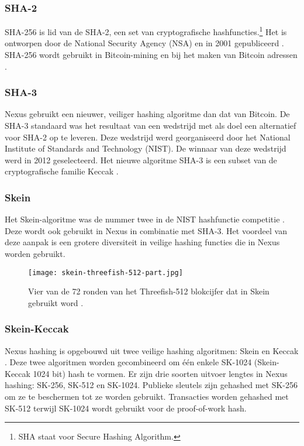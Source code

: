 \documentclass[11pt]{article}
\begin{document}
\subsubsection{SHA-2}

SHA-256 is lid van de SHA-2, een set van cryptografische hashfuncties.\footnote{SHA staat voor Secure Hashing Algorithm.}
Het is ontworpen door de National Security Agency (NSA) en in 2001 gepubliceerd \cite{wikisha2}.
SHA-256 wordt gebruikt in Bitcoin-mining en bij het maken van Bitcoin adressen \cite{bitwiki256}.

\subsubsection{SHA-3}

Nexus gebruikt een nieuwer, veiliger hashing algoritme dan dat van Bitcoin. 
De SHA-3 \cite{sha3} standaard was het resultaat van een wedstrijd \cite{nistcompetitionend} met als doel een alternatief voor SHA-2 op te leveren. Deze wedstrijd werd georganiseerd door het National Institute of Standards and Technology (NIST). 
De winnaar van deze wedstrijd werd in 2012 geselecteerd. 
Het nieuwe algoritme SHA-3 is een subset van de cryptografische familie Keccak \cite{nistgovk}.

\subsubsection{Skein}

Het Skein-algoritme was de nummer twee in de NIST hashfunctie competitie \cite{wikiskein}.
Deze wordt ook gebruikt in Nexus in combinatie met SHA-3. Het voordeel van deze aanpak is een grotere diversiteit in veilige hashing functies die in Nexus worden gebruikt.

\begin{wrapfigure}{r}{0.50\textwidth} %
    \caption{Vier van de 72 ronden van het Threefish-512 blokcijfer dat in Skein gebruikt word \cite{skeinpaper}.}
    \centering
    \texttt{[image: skein-threefish-512-part.jpg]}
\end{wrapfigure}

\pagebreak
\subsubsection{Skein-Keccak}

Nexus hashing is opgebouwd uit twee veilige hashing algoritmen: Skein en Keccak \cite{sha3announce}. 
Deze twee algoritmen worden gecombineerd om één enkele SK-1024 (Skein-Keccak 1024 bit) hash te vormen. 
Er zijn drie soorten uitvoer lengtes in Nexus hashing: SK-256, SK-512 en SK-1024. Publieke sleutels zijn gehashed met SK-256 om ze te beschermen tot ze worden gebruikt. 
Transacties worden gehashed met SK-512 terwijl SK-1024 wordt gebruikt voor de proof-of-work hash.
\end{document}
